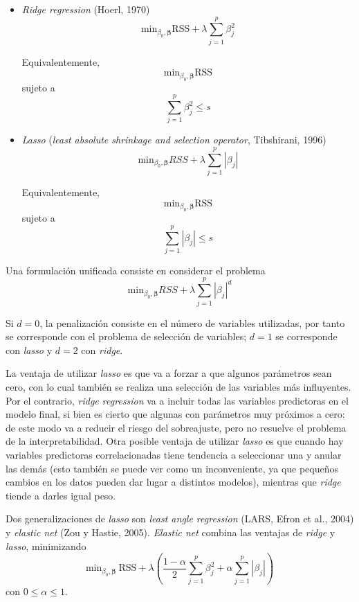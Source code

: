 \documentclass[
]{book}
\theoremstyle{break}
\theoremstyle{definition}
\theoremstyle{definition}
\theoremstyle{definition}
\theoremstyle{definition}
\theoremstyle{remark}
\begin{document}
\begin{itemize}
\item
  \emph{Ridge regression} (Hoerl, 1970)
  \[\mbox{min}_{\beta_0, \boldsymbol{\beta}} \mbox{RSS} + \lambda\sum_{j=1}^{p}\beta_{j}^{2}\]

  Equivalentemente,
  \[\mbox{min}_{\beta_0, \boldsymbol{\beta}} \mbox{RSS}\]
  sujeto a
  \[\sum_{j=1}^{p}\beta_{j}^{2} \le s\]
\item
  \emph{Lasso} (\emph{least absolute shrinkage and selection operator}, Tibshirani, 1996)
  \[\mbox{min}_{\beta_0, \boldsymbol{\beta}} RSS + \lambda\sum_{j=1}^{p}|\beta_{j}|\]

  Equivalentemente,
  \[\mbox{min}_{\beta_0, \boldsymbol{\beta}} \mbox{RSS}\]
  sujeto a
  \[\sum_{j=1}^{p}|\beta_{j}| \le s\]
\end{itemize}

Una formulación unificada consiste en considerar el problema
\[\mbox{min}_{\beta_0, \boldsymbol{\beta}} RSS + \lambda\sum_{j=1}^{p}|\beta_{j}|^d\]

Si \(d=0\), la penalización consiste en el número de variables utilizadas, por tanto se corresponde con el problema de selección de variables; \(d=1\) se corresponde con \emph{lasso} y \(d=2\) con \emph{ridge}.

La ventaja de utilizar \emph{lasso} es que va a forzar a que algunos parámetros sean cero, con lo cual también se realiza una selección de las variables más influyentes.
Por el contrario, \emph{ridge regression} va a incluir todas las variables predictoras en el modelo final, si bien es cierto que algunas con parámetros muy próximos a cero: de este modo va a reducir el riesgo del sobreajuste, pero no resuelve el problema de la interpretabilidad.
Otra posible ventaja de utilizar \emph{lasso} es que cuando hay variables predictoras correlacionadas tiene tendencia a seleccionar una y anular las demás (esto también se puede ver como un inconveniente, ya que pequeños cambios en los datos pueden dar lugar a distintos modelos), mientras que \emph{ridge} tiende a darles igual peso.

Dos generalizaciones de \emph{lasso} son \emph{least angle regression} (LARS, Efron et al., 2004) y \emph{elastic net} (Zou y Hastie, 2005).
\emph{Elastic net} combina las ventajas de \emph{ridge} y \emph{lasso}, minimizando
\[\mbox{min}_{\beta_0, \boldsymbol{\beta}} \ \mbox{RSS} + \lambda \left( \frac{1 - \alpha}{2}\sum_{j=1}^{p}\beta_{j}^{2} + \alpha \sum_{j=1}^{p}|\beta_{j}| \right)\]
con \(0 \leq \alpha \leq 1\).
\end{document}
